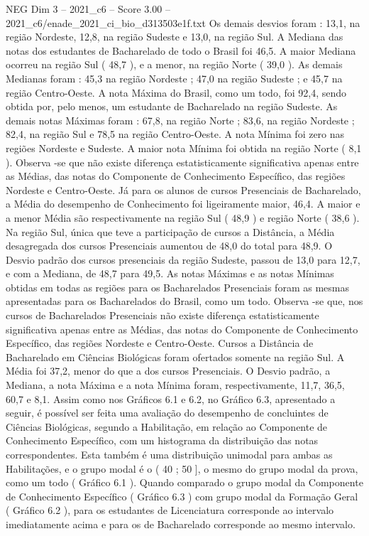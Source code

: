 \begin{textsample}{NEG Dim 3 – 2021\_c6 – Score 3.00 – 2021\_c6/enade\_2021\_ci\_bio\_d313503e1f.txt}
Os demais desvios foram : 13,1, na região Nordeste, 12,8, na região Sudeste e 13,0, na região Sul.
A Mediana das notas dos estudantes de Bacharelado de todo o Brasil foi 46,5.
A maior Mediana ocorreu na região Sul ( 48,7 ), e a menor, na região Norte ( 39,0 ).
As demais Medianas foram : 45,3 na região Nordeste ; 47,0 na região Sudeste ; e 45,7 na região Centro-Oeste.
A nota Máxima do Brasil, como um todo, foi 92,4, sendo obtida por, pelo menos, um estudante de Bacharelado na região Sudeste.
As demais notas Máximas foram : 67,8, na região Norte ; 83,6, na região Nordeste ; 82,4, na região Sul e 78,5 na região Centro-Oeste.
A nota Mínima foi zero nas regiões Nordeste e Sudeste.
A maior nota Mínima foi obtida na região Norte ( 8,1 ).
Observa -se que não existe diferença estatisticamente significativa apenas entre as Médias, das notas do Componente de Conhecimento Específico, das regiões Nordeste e Centro-Oeste.
Já para os alunos de cursos Presenciais de Bacharelado, a Média do desempenho de Conhecimento foi ligeiramente maior, 46,4.
A maior e a menor Média são respectivamente na região Sul ( 48,9 ) e região Norte ( 38,6 ).
Na região Sul, única que teve a participação de cursos a Distância, a Média desagregada dos cursos Presenciais aumentou de 48,0 do total para 48,9.
O Desvio padrão dos cursos presenciais da região Sudeste, passou de 13,0 para 12,7, e com a Mediana, de 48,7 para 49,5.
As notas Máximas e as notas Mínimas obtidas em todas as regiões para os Bacharelados Presenciais foram as mesmas apresentadas para os Bacharelados do Brasil, como um todo.
Observa -se que, nos cursos de Bacharelados Presenciais não existe diferença estatisticamente significativa apenas entre as Médias, das notas do Componente de Conhecimento Específico, das regiões Nordeste e Centro-Oeste.
Cursos a Distância de Bacharelado em Ciências Biológicas foram ofertados somente na região Sul.
A Média foi 37,2, menor do que a dos cursos Presenciais.
O Desvio padrão, a Mediana, a nota Máxima e a nota Mínima foram, respectivamente, 11,7, 36,5, 60,7 e 8,1.
Assim como nos Gráficos 6.1 e 6.2, no Gráfico 6.3, apresentado a seguir, é possível ser feita uma avaliação do desempenho de concluintes de Ciências Biológicas, segundo a Habilitação, em relação ao Componente de Conhecimento Específico, com um histograma da distribuição das notas correspondentes.
Esta também é uma distribuição unimodal para ambas as Habilitações, e o grupo modal é o ( 40 ; 50 ], o mesmo do grupo modal da prova, como um todo ( Gráfico 6.1 ).
Quando comparado o grupo modal da Componente de Conhecimento Específico ( Gráfico 6.3 ) com grupo modal da Formação Geral ( Gráfico 6.2 ), para os estudantes de Licenciatura corresponde ao intervalo imediatamente acima e para os de Bacharelado corresponde ao mesmo intervalo.

\end{textsample}
